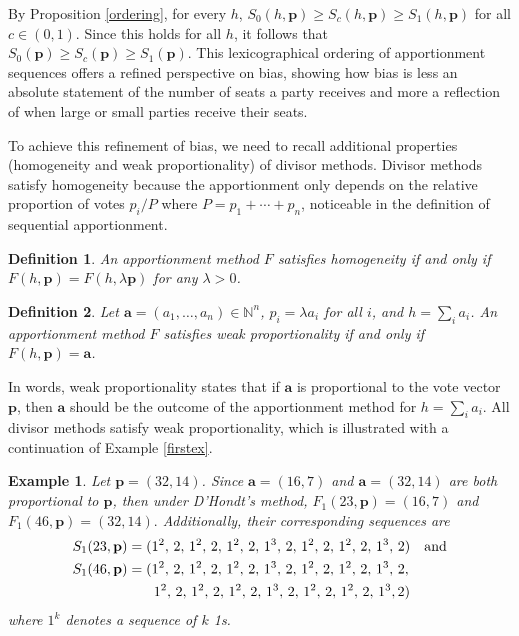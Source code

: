 \documentclass[pdflatex,sn-mathphys-num]{sn-jnl}
\theoremstyle{thmstyleone}%
\theoremstyle{thmstyletwo}%
\newtheorem{example}{Example}%
\theoremstyle{thmstylethree}%
\newtheorem{definition}{Definition}%
\begin{document}
By Proposition \ref{ordering}, for every $h$, $S_0(h, \mathbf p) \ge S_c (h, \mathbf p) \ge S_1(h, \mathbf p)$ for all $c \in (0,1)$. Since this holds for all $h$, it follows that $S_0(\mathbf p) \ge S_c(\mathbf p) \ge S_1( \mathbf p)$.  This lexicographical ordering of apportionment sequences offers a refined perspective on bias, showing how bias is less an absolute statement of the number of seats a party receives and more a reflection of when large or small parties receive their seats.

To achieve this refinement of bias, we need to recall additional properties (homogeneity and weak proportionality) of divisor methods. Divisor methods satisfy homogeneity because the apportionment only depends on the relative proportion of votes $p_i/P$ where $P = p_1 + \cdots + p_n$, noticeable in the definition of sequential apportionment.

\begin{definition} An apportionment method $F$ satisfies homogeneity if and only if $F(h, \mathbf p) = F(h, \lambda \mathbf p)$ for any $\lambda > 0$.
\end{definition}

\begin{definition} Let $\mathbf a = (a_1, \ldots, a_n) \in \mathbb N^n$, $p_i = \lambda a_i$ for all $i$, and $h = \sum_i a_i$.   An apportionment method $F$ satisfies weak proportionality if and only if $F(h, \mathbf p) = \mathbf a$. 
\end{definition}

In words, weak proportionality states that if $\mathbf a$ is proportional to the vote vector $\mathbf p$, then $\mathbf a$ should be the outcome of the apportionment method for $h = \sum_i a_i$.  All divisor methods satisfy weak proportionality, which is illustrated with a continuation of  Example \ref{firstex}.

\begin{example} \label{continuation}
Let $\mathbf p = (32, 14)$. Since $\mathbf a = (16, 7)$ and $\mathbf a = (32, 14)$ are both proportional to $\mathbf p$, then under D'Hondt's method,  $F_1(23, \mathbf p) = (16, 7)$ and  $F_1(46, \mathbf p) = (32, 14).$ Additionally, their
 corresponding sequences are
\begin{align*}
S_1(23, \mathbf p) &= (1^2, \, 2, \,1^2, \,2, \,1^2, \,2, \,1^3, \,2, \,1^2, \,2, \,1^2, \,2, \,1^3, \,2) \quad \mbox{and} \\
 S_1(46, \mathbf p) &= (1^2,\,2, \,1^2, \,2, \,1^2, \,2, \,1^3, \,2, \,1^2, \,2, \,1^2, \,2, \,1^3, \,2, \\
 & \hskip 6mm \,1^2, \,2, \,1^2, \,2, \,1^2, \,2, \,1^3, \,2, \,1^2, \,2, \,1^2, \,2, \,1^3, 2)
 \end{align*}
where $1^k$ denotes a sequence of $k$ 1s.
\end{example}
\end{document}
